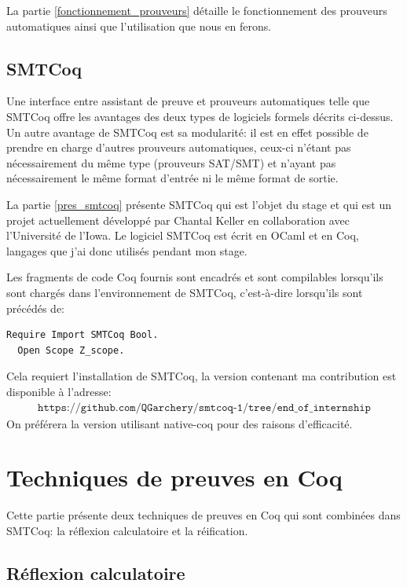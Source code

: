 \documentclass[11pt]{article}
\begin{document}
La partie \ref{fonctionnement_prouveurs} détaille le fonctionnement des prouveurs automatiques ainsi que l'utilisation que nous en ferons.


\subsection{SMTCoq}

Une interface entre assistant de preuve et prouveurs automatiques telle que SMTCoq offre les avantages des deux types de logiciels formels décrits ci-dessus. Un autre avantage de SMTCoq est sa modularité: il est en effet possible de prendre en charge d'autres prouveurs automatiques, ceux-ci n'étant pas nécessairement du même type (prouveurs SAT/SMT) et n'ayant pas nécessairement le même format d'entrée ni le même format de sortie. \medbreak


La partie \ref{pres_smtcoq} présente SMTCoq qui est l'objet du stage et qui est un projet actuellement développé par Chantal Keller en collaboration avec l'Université de l'Iowa. Le logiciel SMTCoq est écrit en OCaml et en Coq, langages que j'ai donc utilisés pendant mon stage. \medbreak

Les fragments de code Coq fournis sont encadrés et sont compilables lorsqu'ils sont chargés dans l'environnement de SMTCoq, c'est-à-dire lorsqu'ils sont précédés de:
\begin{lstlisting}[frame=single]
  Require Import SMTCoq Bool.
  Open Scope Z_scope.
\end{lstlisting}
Cela requiert l'installation de SMTCoq, la version contenant ma contribution est disponible à l'adresse:
\begin{align*}
    \texttt{https://github.com/QGarchery/smtcoq-1/tree/end\char`_of\char`_internship}
\end{align*}
On préférera la version utilisant native-coq \cite{native-coq} pour des raisons d'efficacité.


\newpage

\section{Techniques de preuves en Coq} \label{coq}

Cette partie présente deux techniques de preuves en Coq qui sont combinées dans SMTCoq: la réflexion calculatoire et la réification.


\subsection{Réflexion calculatoire}
\end{document}
